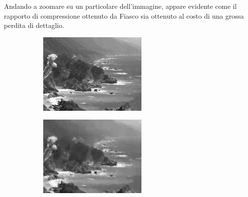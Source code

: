 \documentclass[11pt,a4paper,appendixprefix=true,numbers=noenddot]{scrreprt}
\begin{document}
Andando a zoomare su un particolare dell'immagine, appare evidente come il rapporto di compressione ottenuto da Fiasco sia ottenuto al costo di una grossa perdita di dettaglio.

\begin{figure}[!ht]
  \centering
    \begin{subfigure}[t]{0.47\textwidth}
        \includegraphics[width=\textwidth]{images/california-coast-jpeg-detail.png}
    \end{subfigure}
    \begin{subfigure}[t]{0.47\textwidth}
        \includegraphics[width=\textwidth]{images/california-coast-fiasco-detail.png}
    \end{subfigure}
    

\end{figure}
\end{document}
